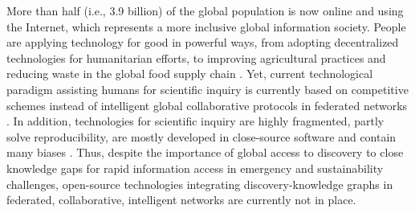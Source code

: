 \documentclass[11pt, a4paper]{article} %
\begin{document}
More than half (i.e., 3.9 billion) of the global population is now
online and using the Internet, which represents a more inclusive
global information society. People are applying technology for good in
powerful ways, from adopting decentralized technologies for
humanitarian efforts, to improving agricultural practices and reducing
waste in the global food supply chain \citep{Wilson2018}. Yet, current
technological paradigm assisting humans for scientific inquiry is
currently based on competitive schemes instead of intelligent global
collaborative protocols in federated networks \citep{Dilley2016}. In
addition, technologies for scientific inquiry are highly fragmented,
partly solve reproducibility, are mostly developed in close-source
software and contain many biases
\citep{Inhaber1977,Ioannidis2005,Fang2011,Gunther2018,Hardwicke2018,Mehrabi2019,Real2020}. Thus,
despite the importance of global access to discovery to close
knowledge gaps for rapid information access in emergency and
sustainability challenges, open-source technologies integrating
discovery-knowledge graphs in federated, collaborative, intelligent
networks are currently not in place.

\end{document}
